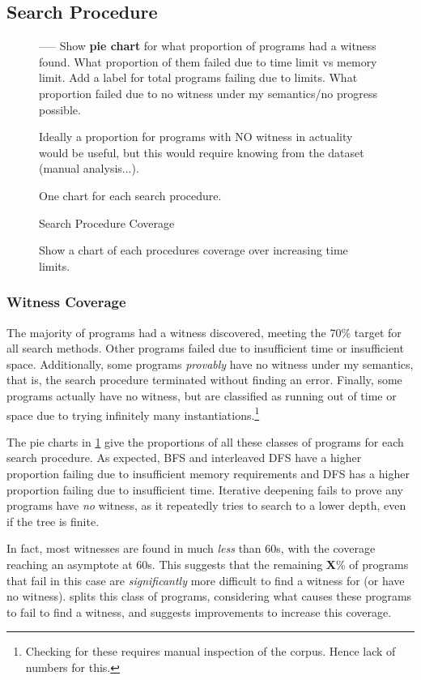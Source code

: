 \subsection{Search Procedure}

\begin{figure}
\centering
-----
Show \textbf{pie chart} for what proportion of programs had a witness found. What proportion of them failed due to time limit vs memory limit. Add a label for total programs failing due to limits. What proportion failed due to no witness under my semantics/no progress possible.

Ideally a proportion for programs with NO witness in actuality would be useful, but this would require knowing from the dataset (manual analysis...).

One chart for each search procedure.
\caption{Search Procedure Coverage}
\label{fig:PieChart}
\end{figure}

\begin{figure}\centering
Show a chart of each procedures coverage over increasing time limits.
\label{fig:CoverageOverTime}
\end{figure}

\subsubsection{Witness Coverage}
The majority of programs had a witness discovered, meeting the 70\% target for all search methods. Other programs failed due to insufficient time or insufficient space. Additionally, some programs \textit{provably} have no witness under my semantics, that is, the search procedure terminated without finding an error. Finally, some programs actually have no witness, but are classified as running out of time or space due to trying infinitely many instantiations.\footnote{Checking for these requires manual inspection of the corpus. Hence lack of numbers for this.} 

The pie charts in \cref{fig:PieChart} give the proportions of all these classes of programs for each search procedure. As expected, BFS and interleaved DFS have a higher proportion failing due to insufficient memory requirements and DFS has a higher proportion failing due to insufficient time. Iterative deepening fails to prove any programs have \textit{no} witness, as it repeatedly tries to search to a lower depth, even if the tree is finite. 

In fact, most witnesses are found in much \textit{less} than 60s, with the coverage reaching an asymptote at 60s. This suggests that the remaining \textbf{X}\% of programs that fail in this case are \textit{significantly} more difficult to find a witness for (or have no witness).  splits this class of programs, considering what causes these programs to fail to find a witness, and suggests improvements to increase this coverage.

